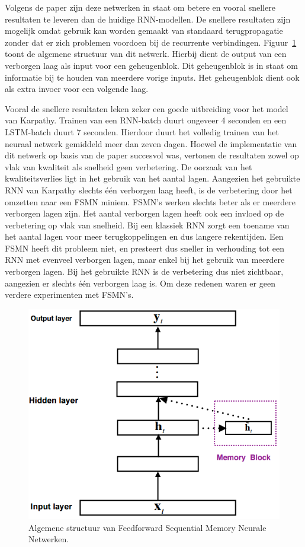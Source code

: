 Volgens de paper zijn deze netwerken in staat om betere en vooral snellere resultaten te leveren dan de huidige RNN-modellen. De snellere resultaten zijn mogelijk omdat gebruik kan worden gemaakt van standaard terugpropagatie zonder dat er zich problemen voordoen bij de recurrente verbindingen. Figuur~\ref{fig:fsmn} toont de  algemene structuur van dit netwerk. Hierbij dient de output van een verborgen laag als input voor een geheugenblok. Dit geheugenblok is in staat om informatie bij te houden van meerdere vorige inputs. Het geheugenblok dient ook als extra invoer voor een volgende laag.

Vooral de snellere resultaten leken zeker een goede uitbreiding voor het model van Karpathy. Trainen van een RNN-batch duurt ongeveer 4 seconden en een LSTM-batch duurt 7 seconden. Hierdoor duurt het volledig trainen van het neuraal netwerk gemiddeld meer dan zeven dagen.
Hoewel de implementatie van dit netwerk op basis van de paper succesvol was, vertonen de resultaten zowel op vlak van kwaliteit als snelheid geen verbetering. De oorzaak van het kwaliteitsverlies ligt in het gebruik van het aantal lagen. Aangezien het gebruikte RNN van Karpathy slechts \'e\'en verborgen laag heeft, is de verbetering door het omzetten naar een FSMN miniem. FSMN's werken slechts beter als er meerdere verborgen lagen zijn. Het aantal verborgen lagen heeft ook een invloed op de verbetering op vlak van snelheid. Bij een klassiek RNN zorgt een toename van het aantal lagen voor meer terugkoppelingen en dus langere rekentijden. Een FSMN heeft dit probleem niet, en presteert dus sneller in verhouding tot een RNN met evenveel verborgen lagen, maar enkel bij het gebruik van meerdere verborgen lagen. Bij het gebruikte RNN is de verbetering dus niet zichtbaar, aangezien er slechts \'e\'en verborgen laag is. Om deze redenen waren er geen verdere experimenten met FSMN's.

\begin{figure}[tb]
	\centering
	\includegraphics[width=0.6\linewidth]{Images/fsmn_ours}
	\caption{Algemene structuur van Feedforward Sequential Memory Neurale Netwerken.}
	\label{fig:fsmn}
\end{figure}

